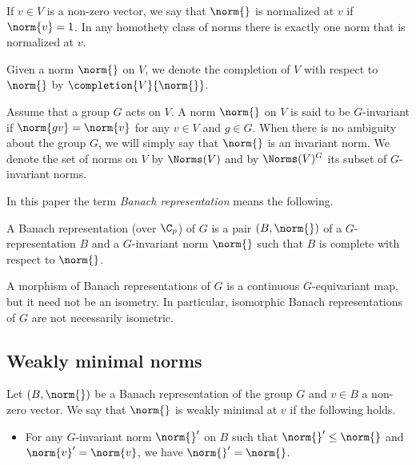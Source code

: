 If $v\in V$ is a non-zero vector, we say that $\norm{}$ is normalized at $v$ if $\norm{v}=1$.
In any homothety class of norms there is exactly one norm that is normalized at $v$.

Given a norm $\norm{}$ on $V$, we denote the completion of $V$ with respect to $\norm{}$ by $\completion{V}{\norm{}}$.

Assume that a group $G$ acts on $V$.    
A norm $\norm{}$ on $V$ is said to be $G$-invariant if $\norm{gv}=\norm{v}$ for any $v\in V$ and $g\in G$.    
When there is no ambiguity about the group $G$, we will simply say that $\norm{}$ is an invariant norm.
We denote the set of norms on $V$ by $\Norms(V)$ and by $\Norms(V)^G$ its subset of $G$-invariant norms.

In this paper the term \textit{Banach representation} means the following.
\begin{defn}\label{def_Banach_rep}
A Banach representation (over $\C_p$) of $G$ is a pair $(B,\norm{})$ of a $G$-representation $B$ and a $G$-invariant norm $\norm{}$ such that $B$ is complete with respect to $\norm{}$.
\end{defn} 

A morphism of Banach representations of $G$ is a continuous $G$-equivariant map, but it need not be an isometry.
In particular, isomorphic Banach representations of $G$ are not necessarily isometric.

\subsection{Weakly minimal norms}
\begin{defn}
Let $(B,\norm{})$ be a Banach representation of the group $G$ and $v\in B$ a non-zero vector.
We say that $\norm{}$ is weakly minimal at $v$ if the following holds.
    \begin{itemize}
    \item For any $G$-invariant norm $\norm{}'$ on $B$ such that $\norm{}'\leq \norm{}$ and $\norm{v}'=\norm{v}$, we have $\norm{}'=\norm{}$.
    \end{itemize}
\end{defn} 

